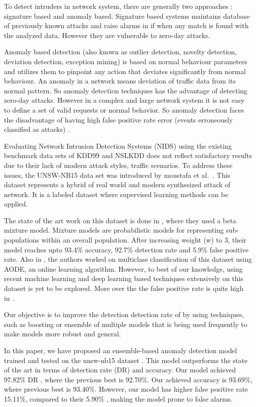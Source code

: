 \documentclass[14pt, conference]{IEEEtran}
\begin{document}
To detect intruders in network system, there are generally two approaches : signature based and anomaly based. Signature based systems maintains database of previously known attacks and raise alarms in if when any match is found with the analyzed data. However they are vulnerable  to zero-day attacks.

Anomaly based detection (also known  as outlier detection, novelty detection, deviation detection, exception mining) is based on normal behaviour parameters and utilizes them to pinpoint any action that deviates significantly from normal behaviour. An anomaly in a network means deviation of traffic data from its normal pattern. So anomaly detection techniques has the advantage of detecting zero-day attacks. However in a complex and large network system it is not easy to define a set of valid requests or normal behavior. So anomaly detection faces the disadvantage of having high false positive rate error (events erroneously classified as attacks) .

Evaluating Network Intrusion Detection Systems (NIDS) using the existing benchmark data sets of KDD99 and NSLKDD does not reflect satisfactory results due to their lack of modern attack styles, traffic scenarios. To address these issues, the UNSW-NB15 data set was introduced by moustafa et al.~\cite{moustafa2015unsw}. This dataset represents a hybrid of real world and modern synthesized attack of network. It is a labeled dataset where supervised learning methods can be applied.

The state of the art work on this dataset is done in \cite{moustafa2018anomaly}, where they used a beta mixture model. Mixture models are probabilistic models for representing sub-populations within an overall population. After increasing weight (w) to 3, their model reaches upto 93.4\% accuracy, 92.7\% detection rate and 5.9\% false positive rate. Also in \cite{nawir2018multi}, the authors worked on multiclass classification of this dataset using AODE, an online learning algorithm.
However, to best of our knowledge, using recent machine learning and deep learning based techniques extensively on this dataset is yet to be explored. More over the the  false positive rate is quite high in~\cite{moustafa2018anomaly}. 

Our objective is to improve the detection  detection rate of  by using techniques, such as boosting or ensemble of multiple models that is being used frequently to make models more robust and general. 

In this paper, we have proposed an ensemble-based anomaly detection model trained and tested on  the unsw-nb15 dataset \cite{moustafa2015unsw}. This model outperforms the state of the art \cite{moustafa2018anomaly} in terms of detection rate (DR) and accuracy. Our model achieved 97.82\% DR , where the previous best is 92.70\%. Our achieved accuracy is 93.69\%, where previous best is 93.40\%. However, our model has higher false positive rate 15.11\%, compared to their 5.90\% , making the model prone to false alarms.
\end{document}
